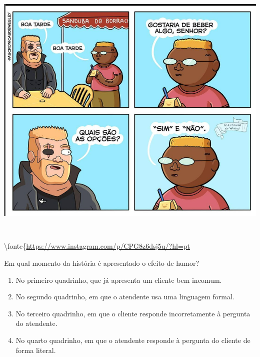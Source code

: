 \hypertarget{uma-imagem-contendo-desenho-tuxe9cnico-descriuxe7uxe3o-gerada-automaticamente}{%
\subsection{\texorpdfstring{\protect\includegraphics[width=5.90556in,height=4.96042in]{./imgSAEB_6_POR/media/image42.png}}{Uma imagem contendo Desenho técnico Descrição gerada automaticamente}}\label{uma-imagem-contendo-desenho-tuxe9cnico-descriuxe7uxe3o-gerada-automaticamente}}

\textbackslash fonte\{\url{https://www.instagram.com/p/CPG8z6dsj5u/?hl=pt}

Em qual momento da história é apresentado o efeito de humor?

\begin{enumerate}
\def\labelenumi{\alph{enumi})}
\item
  No primeiro quadrinho, que já apresenta um cliente bem incomum.
\item
  No segundo quadrinho, em que o atendente usa uma linguagem formal.
\item
  No terceiro quadrinho, em que o cliente responde incorretamente à
  pergunta do atendente.
\item
  No quarto quadrinho, em que o atendente responde à pergunta do cliente
  de forma literal.
\end{enumerate}

